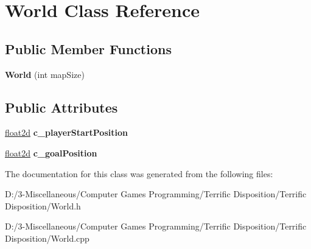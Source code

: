 \hypertarget{class_world}{}\section{World Class Reference}
\label{class_world}
\subsection*{Public Member Functions}
\begin{DoxyCompactItemize}
\item 
\mbox{\label{class_world_a892fe9fd55fa5cd033a4a517d282bee5}} 
{\bfseries World} (int map\+Size)
\end{DoxyCompactItemize}
\subsection*{Public Attributes}
\begin{DoxyCompactItemize}
\item 
\mbox{\label{class_world_a3ba79438d083e13b0da8c4c35a3ea64f}} 
\hyperlink{structfloat2d}{float2d} {\bfseries c\+\_\+player\+Start\+Position}
\item 
\mbox{\label{class_world_a2fd5f184ce854b528748d81749956e31}} 
\hyperlink{structfloat2d}{float2d} {\bfseries c\+\_\+goal\+Position}
\end{DoxyCompactItemize}


The documentation for this class was generated from the following files\+:\begin{DoxyCompactItemize}
\item 
D\+:/3-\/\+Miscellaneous/\+Computer Games Programming/\+Terrific Disposition/\+Terrific Disposition/World.\+h\item 
D\+:/3-\/\+Miscellaneous/\+Computer Games Programming/\+Terrific Disposition/\+Terrific Disposition/World.\+cpp\end{DoxyCompactItemize}

